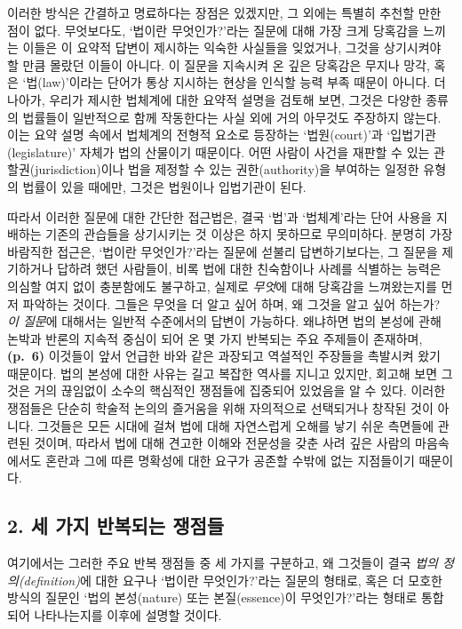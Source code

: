 \documentclass[12pt, oneside]{book}  %
\begin{document}
이러한 방식은 간결하고 명료하다는 장점은 있겠지만, 그 외에는 특별히
추천할 만한 점이 없다. 무엇보다도, `법이란 무엇인가?'라는 질문에 대해
가장 크게 당혹감을 느끼는 이들은 이 요약적 답변이 제시하는 익숙한
사실들을 잊었거나, 그것을 상기시켜야 할 만큼 몰랐던 이들이 아니다. 이
질문을 지속시켜 온 깊은 당혹감은 무지나 망각, 혹은 `법(law)'이라는
단어가 통상 지시하는 현상을 인식할 능력 부족 때문이 아니다. 더 나아가,
우리가 제시한 법체계에 대한 요약적 설명을 검토해 보면, 그것은 다양한
종류의 법률들이 일반적으로 함께 작동한다는 사실 외에 거의 아무것도
주장하지 않는다. 이는 요약 설명 속에서 법체계의 전형적 요소로 등장하는
`법원(court)'과 `입법기관(legislature)' 자체가 법의 산물이기 때문이다.
어떤 사람이 사건을 재판할 수 있는 관할권(jurisdiction)이나 법을 제정할
수 있는 권한(authority)을 부여하는 일정한 유형의 법률이 있을 때에만,
그것은 법원이나 입법기관이 된다.

따라서 이러한 질문에 대한 간단한 접근법은, 결국 `법'과 `법체계'라는 단어
사용을 지배하는 기존의 관습들을 상기시키는 것 이상은 하지 못하므로
무의미하다. 분명히 가장 바람직한 접근은, `법이란 무엇인가?'라는 질문에
섣불리 답변하기보다는, 그 질문을 제기하거나 답하려 했던 사람들이, 비록
법에 대한 친숙함이나 사례를 식별하는 능력은 의심할 여지 없이 충분함에도
불구하고, 실제로 \emph{무엇}에 대해 당혹감을 느껴왔는지를 먼저 파악하는
것이다. 그들은 무엇을 더 알고 싶어 하며, 왜 그것을 알고 싶어 하는가?
\emph{이 질문}에 대해서는 일반적 수준에서의 답변이 가능하다. 왜냐하면
법의 본성에 관해 논박과 반론의 지속적 중심이 되어 온 몇 가지 반복되는
주요 주제들이 존재하며, \textbf{(p.~6)} 이것들이 앞서 언급한 바와 같은
과장되고 역설적인 주장들을 촉발시켜 왔기 때문이다. 법의 본성에 대한
사유는 길고 복잡한 역사를 지니고 있지만, 회고해 보면 그것은 거의
끊임없이 소수의 핵심적인 쟁점들에 집중되어 있었음을 알 수 있다. 이러한
쟁점들은 단순히 학술적 논의의 즐거움을 위해 자의적으로 선택되거나 창작된
것이 아니다. 그것들은 모든 시대에 걸쳐 법에 대해 자연스럽게 오해를 낳기
쉬운 측면들에 관련된 것이며, 따라서 법에 대해 견고한 이해와 전문성을
갖춘 사려 깊은 사람의 마음속에서도 혼란과 그에 따른 명확성에 대한 요구가
공존할 수밖에 없는 지점들이기 때문이다.

\subsection{\texorpdfstring{\textbf{2. 세 가지 반복되는
쟁점들}}{2. 세 가지 반복되는 쟁점들}}\label{uxc138-uxac00uxc9c0-uxbc18uxbcf5uxb418uxb294-uxc7c1uxc810uxb4e4}

여기에서는 그러한 주요 반복 쟁점들 중 세 가지를 구분하고, 왜 그것들이
결국 \emph{법의 정의(definition)}에 대한 요구나 `법이란 무엇인가?'라는
질문의 형태로, 혹은 더 모호한 방식의 질문인 `법의 본성(nature) 또는
본질(essence)이 무엇인가?'라는 형태로 통합되어 나타나는지를 이후에
설명할 것이다.
\end{document}
